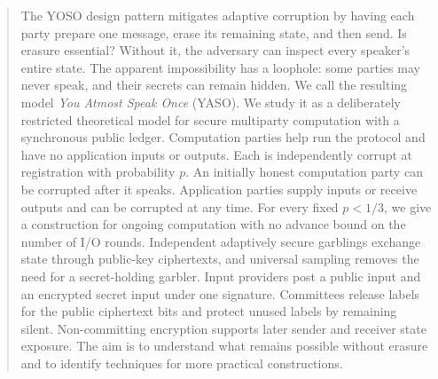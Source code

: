 \begin{abstract}
The YOSO design pattern mitigates adaptive corruption by having each
party prepare one message, erase its remaining state, and then send.
Is erasure essential?  Without it, the adversary can inspect every
speaker's entire state.  The apparent impossibility has a loophole:
some parties may never speak, and their secrets can remain hidden.
We call the resulting model \emph{You Atmost Speak Once} (YASO).
We study it as a deliberately restricted theoretical model for secure
multiparty computation with a synchronous public ledger.  Computation
parties help run the protocol and have no application inputs or outputs.
Each is independently corrupt at registration with probability $p$.
An initially honest computation party can be corrupted after it speaks.
Application parties supply inputs or receive outputs and can be corrupted
at any time.
For every fixed $p<1/3$, we give a construction for ongoing computation
with no advance bound on the number of I/O rounds.  Independent adaptively
secure garblings exchange state through public-key ciphertexts, and
universal sampling removes the need for a secret-holding garbler.
Input providers post a public input and an encrypted secret input under
one signature.  Committees release labels for the public ciphertext bits and protect
unused labels by remaining silent.  Non-committing encryption supports
later sender and receiver state exposure.  The aim is to understand what remains
possible without erasure and to identify techniques for more practical
constructions.
\end{abstract}
